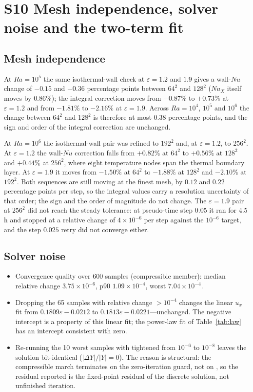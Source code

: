 \documentclass[preprint,11pt,a4paper,times,doubleblind]{elsarticle}
\begin{document}
\section*{S10 Mesh independence, solver noise and the two-term fit}
\subsection*{Mesh independence}
At $Ra=10^5$ the same isothermal-wall check at $\varepsilon=1.2$ and $1.9$ gives a wall-$Nu$
change of $-0.15$ and $-0.36$ percentage points between $64^2$ and $128^2$ ($Nu_X$ itself moves by
$0.86\%$); the integral correction moves from $+0.87\%$ to $+0.73\%$ at $\varepsilon=1.2$ and from
$-1.81\%$ to $-2.16\%$ at $\varepsilon=1.9$. Across $Ra=10^4$, $10^5$ and $10^6$ the change between $64^2$ and $128^2$ is therefore at most
$0.38$ percentage points, and the sign and order of the integral correction are unchanged.

At $Ra=10^6$ the isothermal-wall pair was refined to $192^2$ and, at $\varepsilon=1.2$, to
$256^2$. At $\varepsilon=1.2$ the wall-$Nu$ correction falls from $+0.82\%$ at $64^2$ to $+0.56\%$
at $128^2$ and $+0.44\%$ at $256^2$, where eight temperature nodes span the thermal boundary layer.
At $\varepsilon=1.9$ it moves from $-1.50\%$ at $64^2$ to $-1.88\%$ at $128^2$ and $-2.10\%$ at
$192^2$. Both sequences are still moving at the finest mesh, by $0.12$ and $0.22$ percentage
points per step, so the integral values carry a resolution uncertainty of that order; the sign and
the order of magnitude do not change. The $\varepsilon=1.9$ pair at $256^2$ did not reach the
steady tolerance: at pseudo-time step $0.05$ it ran for $4.5$\,h and stopped at a relative change of
$4\times10^{-6}$ per step against the $10^{-6}$ target, and the step $0.025$ retry did not
converge either.




\subsection*{Solver noise}



\begin{itemize}
\item Convergence quality over 600 samples (compressible member): median relative change
$3.75\times10^{-6}$, p90 $1.09\times10^{-4}$, worst $7.04\times10^{-4}$.
\item Dropping the 65 samples with relative change $>10^{-4}$ changes the linear $u_x$ fit from
$0.1809\varepsilon-0.0212$ to $0.1813\varepsilon-0.0221$---unchanged. The negative intercept is a
property of this linear fit; the power-law fit of Table~\ref{tab:law} has an intercept consistent
with zero.
\item Re-running the 10 worst samples with  tightened from $10^{-6}$ to
$10^{-8}$ leaves the solution bit-identical ($|\Delta Y|/|Y|=0$). The reason is
structural: the compressible march terminates on the zero-iteration guard, not on
, so the residual reported is the fixed-point residual of the discrete solution,
not unfinished iteration.
\end{itemize}
\end{document}

